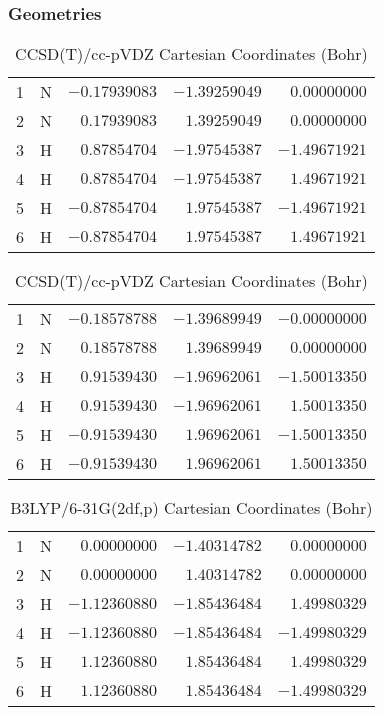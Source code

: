 \documentclass[10pt,oneside]{article}
\begin{document}
\clearpage

\subsection{}

\begin{table}[h!]
\subsubsection*{Geometries}
\begin{multicols}{2}
\centering
\caption{CCSD(T)/cc-pVTZ Cartesian Coordinates (Bohr)}
\begin{tabular}{llrrr}
\toprule
1  & N  & $-0.17939083$ & $-1.39259049$ & $ 0.00000000$ \\
2  & N  & $ 0.17939083$ & $ 1.39259049$ & $ 0.00000000$ \\
3  & H  & $ 0.87854704$ & $-1.97545387$ & $-1.49671921$ \\
4  & H  & $ 0.87854704$ & $-1.97545387$ & $ 1.49671921$ \\
5  & H  & $-0.87854704$ & $ 1.97545387$ & $-1.49671921$ \\
6  & H  & $-0.87854704$ & $ 1.97545387$ & $ 1.49671921$ \\
\bottomrule
\end{tabular}
\caption{CCSD(T)/cc-pVDZ Cartesian Coordinates (Bohr)}
\begin{tabular}{llrrr}
\toprule
1  & N  & $-0.18578788$ & $-1.39689949$ & $-0.00000000$ \\
2  & N  & $ 0.18578788$ & $ 1.39689949$ & $ 0.00000000$ \\
3  & H  & $ 0.91539430$ & $-1.96962061$ & $-1.50013350$ \\
4  & H  & $ 0.91539430$ & $-1.96962061$ & $ 1.50013350$ \\
5  & H  & $-0.91539430$ & $ 1.96962061$ & $-1.50013350$ \\
6  & H  & $-0.91539430$ & $ 1.96962061$ & $ 1.50013350$ \\
\bottomrule
\end{tabular}
\end{multicols}
\end{table}

\begin{table}[h]
\centering
\caption{B3LYP/6-31G(2df,p) Cartesian Coordinates (Bohr)}
\begin{tabular}{llrrr}
\toprule
1  & N  & $ 0.00000000$ & $-1.40314782$ & $ 0.00000000$ \\
2  & N  & $ 0.00000000$ & $ 1.40314782$ & $ 0.00000000$ \\
3  & H  & $-1.12360880$ & $-1.85436484$ & $ 1.49980329$ \\
4  & H  & $-1.12360880$ & $-1.85436484$ & $-1.49980329$ \\
5  & H  & $ 1.12360880$ & $ 1.85436484$ & $ 1.49980329$ \\
6  & H  & $ 1.12360880$ & $ 1.85436484$ & $-1.49980329$ \\
\bottomrule
\end{tabular}
\end{table}
\end{document}
